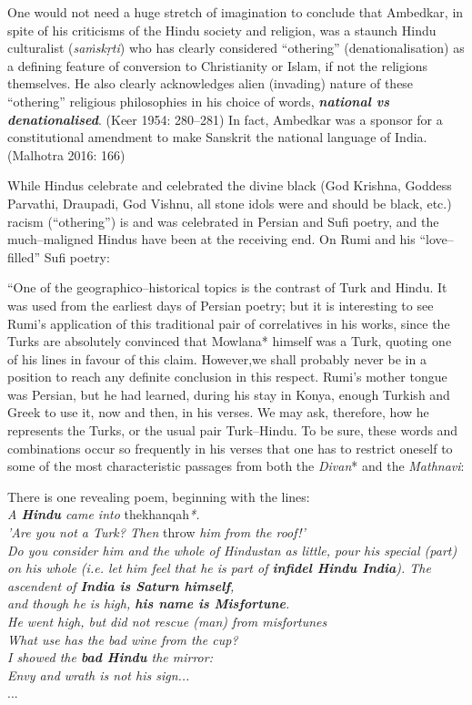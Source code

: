 One would not need a huge stretch of imagination to conclude that Ambedkar, in spite of his criticisms of the Hindu society and religion, was a staunch Hindu culturalist (\textit{saṁskṛti}) who has clearly considered “othering” (denationalisation) as a defining feature of conversion to Christianity or Islam, if not the religions themselves. He also clearly acknowledges alien (invading) nature of these “othering” religious philosophies in his choice of words, \textit{\textbf{national vs denationalised}}. (Keer 1954: 280–281) In fact, Ambedkar was a sponsor for a constitutional amendment to make Sanskrit the national language of India. (Malhotra 2016: 166)

While Hindus celebrate and celebrated the divine black (God Krishna, Goddess Parvathi, Draupadi, God Vishnu, all stone idols were and should be black, etc.) racism (“othering”) is and was celebrated in Persian and Sufi poetry, and the much–maligned Hindus have been at the receiving end. On Rumi and his “love–filled” Sufi poetry:

\begin{myquote}
“One of the geographico–historical topics is the contrast of Turk and Hindu. It was used from the earliest days of Persian poetry; but it is interesting to see Rumi's application of this traditional pair of correlatives in his works, since the Turks are absolutely convinced that Mowlana* himself was a Turk, quoting one of his lines in favour of this claim. However,we shall probably never be in a position to reach any definite conclusion in this respect. Rumi's mother tongue was Persian, but he had learned, during his stay in Konya, enough Turkish and Greek to use it, now and then, in his verses. We may ask, therefore, how he represents the Turks, or the usual pair Turk–Hindu. To be sure, these words and combinations occur so frequently in his verses that one has to restrict oneself to some of the most characteristic passages from both the \textit{Divan}* and the \textit{Mathnavi}:
\end{myquote}

\begin{myquote}
There is one revealing poem, beginning with the lines:\\\textit{A \textbf{Hindu} came into }thekhanqah\textit{*.}\\\textit{'Are you not a Turk? Then }throw\textit{ him from the roof!'\\ Do you consider him and the whole of Hindustan as little, pour his special (part) on his whole (i.e. let him feel that he is part of \textbf{infidel Hindu India}). The ascendent of \textbf{India is Saturn himself},\\ and though he is high, \textbf{his name is Misfortune}.\\ He went high, but did not rescue (man) from misfortunes\\ What use has the bad wine from the cup?\\ I showed the \textbf{bad Hindu} the mirror:}\\\textit{Envy and wrath is not his sign...}\\...
\end{myquote}

